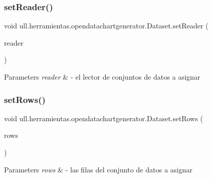 \subsubsection{\texorpdfstring{set\+Reader()}{setReader()}}
{\footnotesize\ttfamily void ull.\+herramientas.\+opendatachartgenerator.\+Dataset.\+set\+Reader (\begin{DoxyParamCaption}\item[{\mbox{\hyperlink{classull_1_1herramientas_1_1opendatachartgenerator_1_1_i_reader}{I\+Reader}}}]{reader }\end{DoxyParamCaption})}


\begin{DoxyParams}{Parameters}
{\em reader} & -\/ el lector de conjuntos de datos a asignar \\
\hline
\end{DoxyParams}
\mbox{\label{classull_1_1herramientas_1_1opendatachartgenerator_1_1_dataset_a2dfc0af3a5e9c6e6b2d6bde97bc0981c}} 
\subsubsection{\texorpdfstring{set\+Rows()}{setRows()}}
{\footnotesize\ttfamily void ull.\+herramientas.\+opendatachartgenerator.\+Dataset.\+set\+Rows (\begin{DoxyParamCaption}\item[{Array\+List$<$ \mbox{\hyperlink{classull_1_1herramientas_1_1opendatachartgenerator_1_1_instancia}{Instancia}} $>$}]{rows }\end{DoxyParamCaption})}


\begin{DoxyParams}{Parameters}
{\em rows} & -\/ las filas del conjunto de datos a asignar \\
\hline
\end{DoxyParams}
\mbox{\label{classull_1_1herramientas_1_1opendatachartgenerator_1_1_dataset_aaf8ec45f3cd314bf5eb9c233ab94328d}} 
